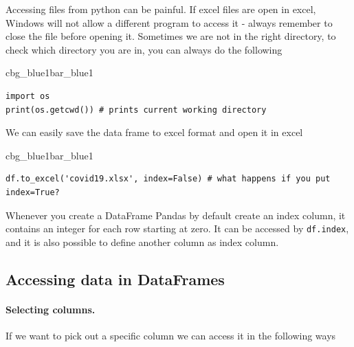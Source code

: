 \documentclass[%
oneside,                 %
final,                   %
10pt]{article}
\newenvironment{_pro_tight}[2]{
   \def\FrameCommand{\color{#2}\vrule width 1mm\normalcolor\colorbox{#1}}
   \FrameRule0.6pt\MakeFramed {\advance\hsize-2mm\FrameRestore}\vskip3mm}
   {\vskip0mm\endMakeFramed}
\newenvironment{pro}[2]{
\bgroup\rmfamily
\fboxsep=0mm\relax
\begin{_pro_tight}{#1}{#2}
\list{}{\parsep=-2mm\parskip=0mm\topsep=0pt\leftmargin=2mm
\rightmargin=2\leftmargin\leftmargin=4pt\relax}
\item\relax}
{\endlist\end{_pro_tight}\egroup}
\newenvironment{notice_mdfboxadmon}[1][]{
\begin{notice_mdfboxmdframed}[frametitle=#1]
}
{
\end{notice_mdfboxmdframed}
}
\begin{document}
\begin{notice_mdfboxadmon}
Accessing files from python can be painful. If excel files are open in excel, Windows will not allow a different program to access it - always remember to close the file before opening it. Sometimes we are not in the right directory, to check which directory you are in, you can always do the following



\begin{pro}{cbg_blue1}{bar_blue1}\begin{Verbatim}[numbers=none,fontsize=\fontsize{9pt}{9pt},baselinestretch=0.95,xleftmargin=2mm]
import os
print(os.getcwd()) # prints current working directory

\end{Verbatim}
\end{pro}
\noindent
\end{notice_mdfboxadmon} %



We can easily save the data frame to excel format and open it in excel


\begin{pro}{cbg_blue1}{bar_blue1}\begin{Verbatim}[numbers=none,fontsize=\fontsize{9pt}{9pt},baselinestretch=0.95,xleftmargin=2mm]
df.to_excel('covid19.xlsx', index=False) # what happens if you put index=True?

\end{Verbatim}
\end{pro}
\noindent



\begin{notice_mdfboxadmon}
Whenever you create a DataFrame Pandas by default create an index column, it contains an integer for each row starting at zero. It can be accessed by \texttt{df.index}, and it is also possible to define another column as index column.
\end{notice_mdfboxadmon} %



\subsection{Accessing data in  DataFrames}

\paragraph{Selecting columns.}
If we want to pick out a specific column we can access it in the following ways
\end{document}
